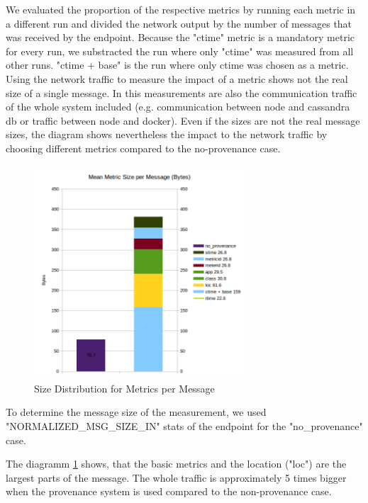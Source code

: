 We evaluated the proportion of the respective metrics by running each metric in a different run and divided the network output by the number of messages that was received by the endpoint. Because the "ctime" metric is a mandatory metric for every run, we substracted the run where only "ctime" was measured from all other runs. "ctime + base" is the run where only ctime was chosen as a metric. Using the network traffic to measure the impact of a metric shows not the real size of a single message. In this measurements are also the communication traffic of the whole system included (e.g. communication between node and cassandra db or traffic between node and docker). Even if the sizes are not the real message sizes, the diagram shows nevertheless the impact to the network traffic by choosing different metrics compared to the no-provenance case.

\begin{figure}[H]
	\center
	\includegraphics[width=0.7\textwidth]{figures/overheaddiagram1.png}
	\caption{Size Distribution for Metrics per Message}
	\label{fig:metricsdistribution}
\end{figure}

To determine the message size of the measurement, we  used  "NORMALIZED\_MSG\_SIZE\_IN" stats of the endpoint for the "no\_provenance" case.

The diagramm \ref{fig:metricsdistribution} shows, that the basic metrics and the location ("loc") are the largest parts of the message. The whole traffic is approximately 5 times bigger when the provenance system is used compared to the non-provenance case.

